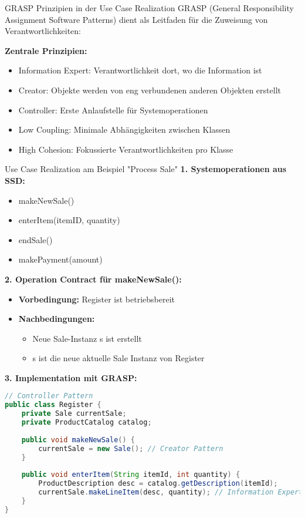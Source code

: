 \begin{concept}{GRASP Prinzipien in der Use Case Realization}
GRASP (General Responsibility Assignment Software Patterns) dient als Leitfaden für die Zuweisung von Verantwortlichkeiten:

\textbf{Zentrale Prinzipien:}
\begin{itemize}
    \item Information Expert: Verantwortlichkeit dort, wo die Information ist
    \item Creator: Objekte werden von eng verbundenen anderen Objekten erstellt
    \item Controller: Erste Anlaufstelle für Systemoperationen
    \item Low Coupling: Minimale Abhängigkeiten zwischen Klassen
    \item High Cohesion: Fokussierte Verantwortlichkeiten pro Klasse
\end{itemize}
\end{concept}

\begin{example2}{Use Case Realization am Beispiel "Process Sale"}
\textbf{1. Systemoperationen aus SSD:}
\begin{itemize}
    \item makeNewSale()
    \item enterItem(itemID, quantity)
    \item endSale()
    \item makePayment(amount)
\end{itemize}

\textbf{2. Operation Contract für makeNewSale():}
\begin{itemize}
    \item \textbf{Vorbedingung:} Register ist betriebsbereit
    \item \textbf{Nachbedingungen:}
    \begin{itemize}
        \item Neue Sale-Instanz s ist erstellt
        \item s ist die neue aktuelle Sale Instanz von Register
    \end{itemize}
\end{itemize}

\textbf{3. Implementation mit GRASP:}
\begin{lstlisting}[language=Java, style=basesmol]
// Controller Pattern
public class Register {
    private Sale currentSale;
    private ProductCatalog catalog;
    
    public void makeNewSale() {
        currentSale = new Sale(); // Creator Pattern
    }
    
    public void enterItem(String itemId, int quantity) {
        ProductDescription desc = catalog.getDescription(itemId);
        currentSale.makeLineItem(desc, quantity); // Information Expert
    }
}
\end{lstlisting}
\end{example2}

